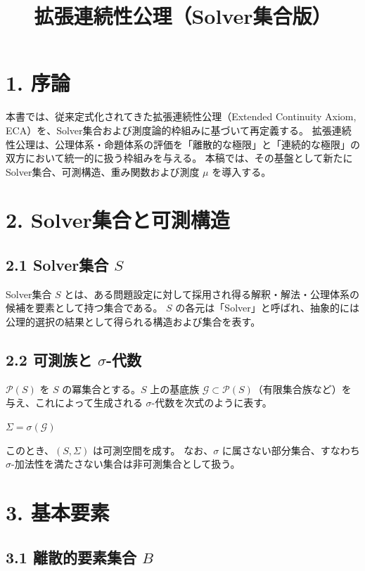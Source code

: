 \documentclass[12pt,a4paper]{article}
\title{拡張連続性公理（Solver集合版）}
\author{}
\date{}
\begin{document}
\maketitle

\section{1. 序論}

本書では、従来定式化されてきた拡張連続性公理（Extended Continuity Axiom, ECA）を、Solver集合および測度論的枠組みに基づいて再定義する。
拡張連続性公理は、公理体系・命題体系の評価を「離散的な極限」と「連続的な極限」の双方において統一的に扱う枠組みを与える。
本稿では、その基盤として新たにSolver集合、可測構造、重み関数および測度 $\mu$ を導入する。

\section{2. Solver集合と可測構造}

\subsection{2.1 Solver集合 $S$}
Solver集合 $S$ とは、ある問題設定に対して採用され得る解釈・解法・公理体系の候補を要素として持つ集合である。
$S$ の各元は「Solver」と呼ばれ、抽象的には公理的選択の結果として得られる構造および集合を表す。

\subsection{2.2 可測族と $\sigma$-代数}

$\mathcal{P}(S)$ を $S$ の冪集合とする。$S$ 上の基底族 $\mathcal{G} \subset \mathcal{P}(S)$（有限集合族など）を与え、これによって生成される $\sigma$-代数を次式のように表す。

$\Sigma = \sigma(\mathcal{G})$

このとき、$(S, \Sigma)$ は可測空間を成す。
なお、$\sigma$ に属さない部分集合、すなわち $\sigma$-加法性を満たさない集合は非可測集合として扱う。

\section{3. 基本要素}

\subsection*{3.1 離散的要素集合 $B$}
\end{document}
